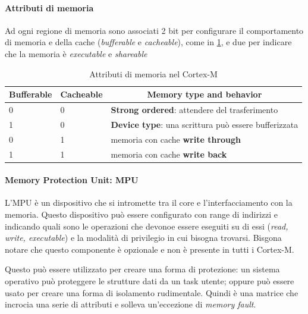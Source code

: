 \documentclass{article}
\begin{document}
\paragraph{Attributi di memoria} Ad ogni regione di memoria sono associati 2 bit per configurare il comportamento di memoria e della cache (\textit{bufferable} e \textit{cacheable}), come in \cref{tab:memory-attributes}, e due per indicare che la memoria è \textit{executable} e \textit{shareable} 

\begin{table}
  \caption{Attributi di memoria nel Cortex-M}\label{tab:memory-attributes}
  \begin{center}
    \begin{tabular}[c]{l|l|l}
      \hline
      \multicolumn{1}{c|}{\textbf{Bufferable}} & 
      \multicolumn{1}{c|}{\textbf{Cacheable}} &
      \multicolumn{1}{c}{\textbf{Memory type and behavior}} \\
      \hline
      0 & 0 & \textbf{Strong ordered}: attendere del trasferimento\\
      1 & 0 & \textbf{Device type}: una scrittura può essere bufferizzata  \\
      0 & 1 & memoria con cache \textbf{write through} \\
      1 & 1 & memoria con cache \textbf{write back}\\
      \hline
    \end{tabular}
  \end{center}
\end{table}

\paragraph{Memory Protection Unit: MPU} L'MPU è un dispositivo che si intromette tra il core e l'interfacciamento con la memoria. Questo dispositivo può essere configurato con range di indirizzi e indicando quali sono le operazioni che devonoe essere eseguiti su di essi (\textit{read, write, executable}) e la modalità di privilegio in cui bisogna trovarsi. Bisgona notare che questo componente è opzionale e non è presente in tutti i Cortex-M.

Questo può essere utilizzato per creare una forma di protezione: un sistema operativo può proteggere le strutture dati da un task utente; oppure può essere usato per creare una forma di isolamento rudimentale. Quindi è una matrice che incrocia una serie di attributi e solleva un'eccezione di \textit{memory fault}.
\end{document}
